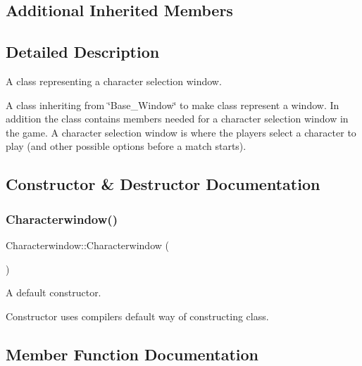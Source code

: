 \subsection*{Additional Inherited Members}


\subsection{Detailed Description}
A class representing a character selection window. 

A class inheriting from \char`\"{}\+Base\+\_\+\+Window\char`\"{} to make class represent a window. In addition the class contains members needed for a character selection window in the game. A character selection window is where the players select a character to play (and other possible options before a match starts). 

\subsection{Constructor \& Destructor Documentation}
\mbox{\label{classCharacterwindow_a2f9d2f2231c33265918bc9697f03c894}} 
\subsubsection{\texorpdfstring{Characterwindow()}{Characterwindow()}}
{\footnotesize\ttfamily Characterwindow\+::\+Characterwindow (\begin{DoxyParamCaption}{ }\end{DoxyParamCaption})\hspace{0.3cm}{\ttfamily [default]}}



A default constructor. 

Constructor uses compiler\textquotesingle{}s default way of constructing class. 

\subsection{Member Function Documentation}
\mbox{\label{classCharacterwindow_a3e74d9d40166eb88e2259f4f0d1da2ab}} 
